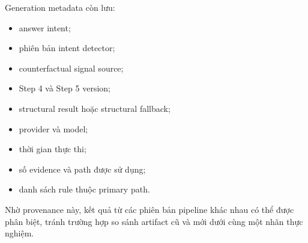 Generation metadata còn lưu:

\begin{itemize}
    \item answer intent;
    \item phiên bản intent detector;
    \item counterfactual signal source;
    \item Step 4 và Step 5 version;
    \item structural result hoặc structural fallback;
    \item provider và model;
    \item thời gian thực thi;
    \item số evidence và path được sử dụng;
    \item danh sách rule thuộc primary path.
\end{itemize}

Nhờ provenance này, kết quả từ các phiên bản pipeline khác nhau có thể được
phân biệt, tránh trường hợp so sánh artifact cũ và mới dưới cùng một nhãn
thực nghiệm.
